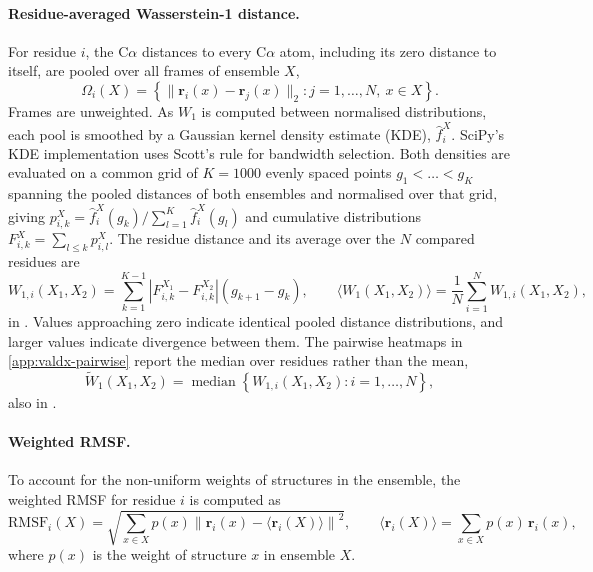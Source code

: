 \paragraph{Residue-averaged Wasserstein-1 distance.}
For residue $i$, the C$\alpha$ distances to every C$\alpha$ atom, including its zero distance to itself, are pooled over all frames of ensemble $X$,
\begin{equation}
    \Omega_i(X)=\left\{\lVert\mathbf r_i(x)-\mathbf r_j(x)\rVert_2 : j=1,\dots,N,\ x\in X\right\}.
    \label{eq:valdx-w1-pool}
\end{equation}
Frames are unweighted. As $W_1$ is computed between normalised distributions, each pool is smoothed by a Gaussian kernel density estimate (KDE), $\hat f_i^{X}$. SciPy's KDE implementation uses Scott's rule for bandwidth selection.\supercite{virtanenSciPy10Fundamental2020} Both densities are evaluated on a common grid of $K=1000$ evenly spaced points $g_1<\dots<g_K$ spanning the pooled distances of both ensembles and normalised over that grid, giving $p_{i,k}^{X}=\hat f_i^{X}(g_k)/\sum_{l=1}^{K}\hat f_i^{X}(g_l)$ and cumulative distributions $F_{i,k}^{X}=\sum_{l\le k}p_{i,l}^{X}$. The residue distance and its average over the $N$ compared residues are
\begin{equation}
    W_{1,i}(X_1,X_2)=\sum_{k=1}^{K-1}\left|F_{i,k}^{X_1}-F_{i,k}^{X_2}\right|\left(g_{k+1}-g_k\right),
    \qquad
    \langle W_1(X_1,X_2)\rangle=\frac{1}{N}\sum_{i=1}^{N}W_{1,i}(X_1,X_2),
    \label{eq:valdx-w1}
\end{equation}
in \text{\AA}. Values approaching zero indicate identical pooled distance distributions, and larger values indicate divergence between them. The pairwise heatmaps in \cref{app:valdx-pairwise} report the median over residues rather than the mean,
\begin{equation}
    \widetilde W_1(X_1,X_2)=\operatorname{median}\left\{W_{1,i}(X_1,X_2):i=1,\dots,N\right\},
    \label{eq:valdx-w1-median}
\end{equation}
also in \text{\AA}.

\paragraph{Weighted RMSF.}
To account for the non-uniform weights of structures in the ensemble, the weighted RMSF for residue $i$ is computed as
\begin{equation}
    \text{RMSF}_i(X)=\sqrt{\sum_{x\in X}p(x)\left\lVert\mathbf r_i(x)-\langle\mathbf r_i(X)\rangle\right\rVert^2},
    \qquad
    \langle\mathbf r_i(X)\rangle=\sum_{x\in X}p(x)\,\mathbf r_i(x),
    \label{eq:valdx-weighted-rmsf}
\end{equation}
where $p(x)$ is the weight of structure $x$ in ensemble $X$.

